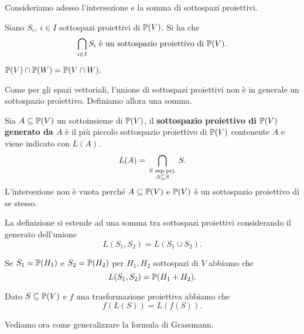 \begin{multicols*}{2}
    \noindent
    Consideriamo adesso l'intersezione e la somma di sottospazi proiettivi.
    \begin{proposition}
    Siano $S_i,\ i\in I$ sottospazi proiettivi di ${\mathbb{P}(V)}$. Si ha che
    \[\bigcap_{i\in I}S_i\text{ \`e un sottospazio proiettivo di }{\mathbb{P}(V)}.\]
    \end{proposition}
    \begin{remark}
    ${\mathbb{P}(V)}\cap{\mathbb{P}(W)}=\mathbb{P}(V\cap W).$
    \end{remark}

    \noindent
    Come per gli spazi vettoriali, l'unione di sottospazi proiettivi non \`e in generale un sottospazio proiettivo. Definiamo allora una somma.

    \begin{definition}
    Sia $A\subseteq{\mathbb{P}(V)}$ un sottoinsieme di ${\mathbb{P}(V)}$, il \textbf{sottospazio proiettivo di ${\mathbb{P}(V)}$ generato da $A$} \`e il pi\`u piccolo sottospazio proiettivo di ${\mathbb{P}(V)}$ contenente $A$ e viene indicato con $L(A)$.
    \[L(A)=\bigcap_{\begin{smallmatrix}S\text{ ssp.prj.}\\ A\subseteq S\end{smallmatrix}}S.\]
    L'intersezione non \`e vuota perch\'e $A\subseteq {\mathbb{P}(V)}$ e ${\mathbb{P}(V)}$ \`e un sottospazio proiettivo di se stesso.
    \end{definition}

    \begin{remark}
    La definizione si estende ad una somma tra sottospazi proiettivi considerando il generato dell'unione
    \[L(S_1,S_2)=L(S_1\cup S_2).\]
    \end{remark}


    \begin{proposition}
    Se $S_1=\mathbb{P}(H_1)$ e $S_2=\mathbb{P}(H_2)$ per $H_1,H_2$ sottospazi di $V$ abbiamo che
    \[L(S_1,S_2)=\mathbb{P}(H_1+H_2).\]
    \end{proposition}
    \begin{proposition}
    Dato $S\subseteq{\mathbb{P}(V)}$ e $f$ una trasformazione proiettiva abbiamo che
    \[f(L(S))=L(f(S)).\]
    \end{proposition}

    \noindent
    Vediamo ora come generalizzare la formula di Grassmann.


\end{multicols*}
